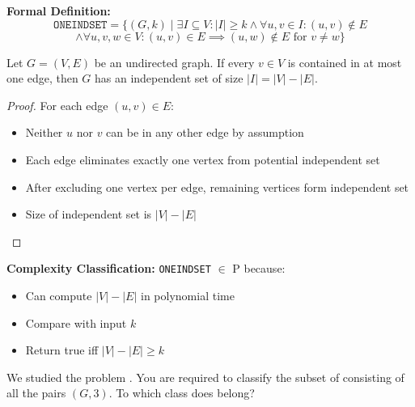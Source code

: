 \begin{solution}
	\textbf{Formal Definition:}
	\[\texttt{ONEINDSET} = \{(G,k) \mid \exists I \subseteq V: |I| \geq k \land \forall u,v \in I: (u,v) \notin E \]\[\land \forall u,v,w \in V: (u,v) \in E \implies (u,w) \notin E \text{ for } v \neq w\}\]

	\begin{theorem}
		Let $G=(V,E)$ be an undirected graph. If every $v \in V$ is contained in at most one edge, then $G$ has an independent set of size $|I| = |V|-|E|$.
	\end{theorem}

	\begin{proof}
		For each edge $(u,v) \in E$:
		\begin{itemize}
			\item Neither $u$ nor $v$ can be in any other edge by assumption
			\item Each edge eliminates exactly one vertex from potential independent set
			\item After excluding one vertex per edge, remaining vertices form independent set
			\item Size of independent set is $|V|-|E|$
		\end{itemize}
	\end{proof}

	\textbf{Complexity Classification:}
	\texttt{ONEINDSET} $\in$ P because:
	\begin{itemize}
		\item Can compute $|V|-|E|$ in polynomial time
		\item Compare with input $k$
		\item Return true iff $|V|-|E| \geq k$
	\end{itemize}
\end{solution}

\begin{ex}[\kCLIQUE{3}]
	We studied the problem \CLIQUE. You are required to classify the subset  of \CLIQUE consisting of all the pairs $(G,3)$. To which class does  belong?
\end{ex}


